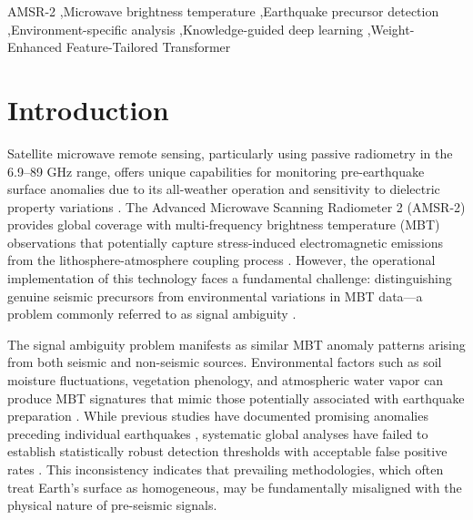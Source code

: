 \documentclass[preprint,review,12pt,authoryear]{elsarticle}
\begin{document}
\begin{frontmatter}
\begin{keyword}
AMSR-2 \sep Microwave brightness temperature \sep Earthquake precursor detection \sep Environment-specific analysis \sep Knowledge-guided deep learning \sep Weight-Enhanced Feature-Tailored Transformer
\end{keyword}

\end{frontmatter}


\section{Introduction} 
Satellite microwave remote sensing, particularly using passive radiometry in the 6.9--89 GHz range, offers unique capabilities for monitoring pre-earthquake surface anomalies due to its all-weather operation and sensitivity to dielectric property variations \citep{pulinetsLithosphereAtmosphereIonosphere2011,wuGEOSSbasedThermalParameters2012}. The Advanced Microwave Scanning Radiometer 2 (AMSR-2) provides global coverage with multi-frequency brightness temperature (MBT) observations that potentially capture stress-induced electromagnetic emissions from the lithosphere-atmosphere coupling process \citep{kawanishiAdvancedMicrowaveScanning2003}. However, the operational implementation of this technology faces a fundamental challenge: distinguishing genuine seismic precursors from environmental variations in MBT data---a problem commonly referred to as signal ambiguity \citep{troninRemoteSensingEarthquakes2006,tramutoliRobustSatelliteTechniques2013}.

The signal ambiguity problem manifests as similar MBT anomaly patterns arising from both seismic and non-seismic sources. Environmental factors such as soil moisture fluctuations, vegetation phenology, and atmospheric water vapor can produce MBT signatures that mimic those potentially associated with earthquake preparation \citep{qiCharacteristicBackgroundMicrowave2023}. While previous studies have documented promising anomalies preceding individual earthquakes \citep{akhoondzadehMultiPrecursorsAnalysis2018,qiSpatiotemporallyWeightedTwostep2020}, systematic global analyses have failed to establish statistically robust detection thresholds with acceptable false positive rates \citep{gellerEarthquakesCannotPredicted1997,cuiSatelliteThermalInfrared2019,contiSystematicReviewMetaAnalysis2021,ciceroneSystematicCompilationEarthquake2009}. This inconsistency indicates that prevailing methodologies, which often treat Earth's surface as homogeneous, may be fundamentally misaligned with the physical nature of pre-seismic signals.
\end{document}
